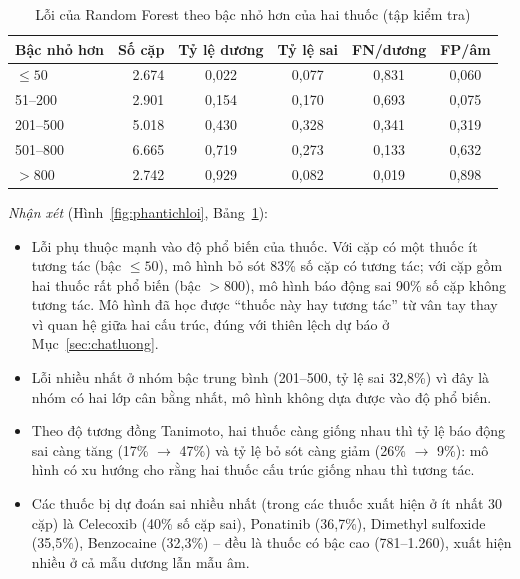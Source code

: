 \documentclass[12pt,a4paper,oneside]{report}
\begin{document}
\begin{table}[H]
  \centering
  \caption{Lỗi của Random Forest theo bậc nhỏ hơn của hai thuốc (tập kiểm tra)}
  \label{tab:loibac}
  \small
  \begin{tabular}{lrcccc}
    \toprule
    \textbf{Bậc nhỏ hơn} & \textbf{Số cặp} & \textbf{Tỷ lệ dương} & \textbf{Tỷ lệ sai} & \textbf{FN/dương} & \textbf{FP/âm} \\
    \midrule
    $\leq 50$ & 2.674 & 0,022 & 0,077 & 0,831 & 0,060 \\
    51--200 & 2.901 & 0,154 & 0,170 & 0,693 & 0,075 \\
    201--500 & 5.018 & 0,430 & 0,328 & 0,341 & 0,319 \\
    501--800 & 6.665 & 0,719 & 0,273 & 0,133 & 0,632 \\
    $> 800$ & 2.742 & 0,929 & 0,082 & 0,019 & 0,898 \\
    \bottomrule
  \end{tabular}
\end{table}

\textit{Nhận xét} (Hình~\ref{fig:phantichloi}, Bảng~\ref{tab:loibac}):
\begin{itemize}
  \item Lỗi phụ thuộc mạnh vào độ phổ biến của thuốc. Với cặp có một
        thuốc ít tương tác (bậc $\leq 50$), mô hình bỏ sót 83\% số cặp có tương
        tác; với cặp gồm hai thuốc rất phổ biến (bậc $> 800$), mô hình báo động
        sai 90\% số cặp không tương tác. Mô hình đã học được ``thuốc này hay
        tương tác'' từ vân tay thay vì quan hệ giữa hai cấu trúc, đúng với thiên
        lệch dự báo ở Mục~\ref{sec:chatluong}.
  \item Lỗi nhiều nhất ở nhóm bậc trung bình (201--500, tỷ lệ sai 32,8\%) vì
        đây là nhóm có hai lớp cân bằng nhất, mô hình không dựa được vào độ
        phổ biến.
  \item Theo độ tương đồng Tanimoto, hai thuốc càng giống nhau thì tỷ lệ báo
        động sai càng tăng (17\% $\rightarrow$ 47\%) và tỷ lệ bỏ sót càng giảm
        (26\% $\rightarrow$ 9\%): mô hình có xu hướng cho rằng hai thuốc cấu trúc
        giống nhau thì tương tác.
  \item Các thuốc bị dự đoán sai nhiều nhất (trong các thuốc xuất hiện ở ít
        nhất 30 cặp) là Celecoxib (40\% số cặp sai), Ponatinib (36,7\%), Dimethyl
        sulfoxide (35,5\%), Benzocaine (32,3\%) -- đều là thuốc có bậc cao
        (781--1.260), xuất hiện nhiều ở cả mẫu dương lẫn mẫu âm.
\end{itemize}
\end{document}
